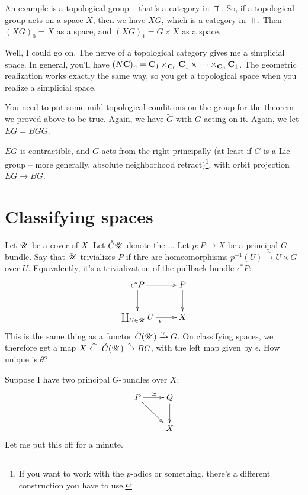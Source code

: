 An example is a topological group -- that's a category in $\Top$.
So, if a topological group acts on a space $X$, then we have $XG$, which is a category in $\Top$.
Then $(XG)_0 = X$ as a space, and $(XG)_1 = G\times X$ as a space.

Well, I could go on.
The nerve of a topological category gives me a simplicial space.
In general, you'll have $(N\mathbf C)_n = \mathbf C_1\times_{\mathbf C_0}\mathbf C_1\times\cdots\times_{\mathbf C_0}\mathbf C_1$.
The geometric realization works exactly the same way, so you get a topological space when you realize a simplicial space.

You need to put some mild topological conditions on the group for the theorem we proved above to be true.
Again, we have $\widetilde{G}$ with $G$ acting on it.
Again, we let $EG = B\widetilde{G}G$.
\begin{theorem}
    $EG$ is contractible, and $G$ acts from the right principally (at least if $G$ is a Lie group -- more generally, absolute neighborhood retract)\footnote{If you want to work with the $p$-adics or something, there's a different construction you have to use.}, with orbit projection $EG\to BG$.
\end{theorem}
\section{Classifying spaces}
Let $\mathscr U$ be a cover of $X$.
Let $\check{C}\mathscr U$ denote the ...
Let $p:P\to X$ be a principal $G$-bundle.
Say that $\mathscr U$ trivializes $P$ if thre are homeomorphisms $p^{-1}(U)\xrightarrow{\simeq} U\times G$ over $U$.
Equivalently, it's a trivialization of the pullback bundle $\epsilon^\ast P$:
\begin{equation*}
    \xymatrix{
	\epsilon^\ast P\ar[r]\ar[d] & P\ar[d]\\
	\coprod_{U\in\cU} U\ar[r]_{\epsilon} & X
    }
\end{equation*}
This is the same thing as a functor $\check{C}(\mathscr U)\xrightarrow{\gamma} G$.
On classifying spaces, we therefore get a map $X\xleftarrow{\simeq} \check{C}(\mathscr U)\xrightarrow{\gamma} BG$, with the left map given by $\epsilon$.
How unique is $\theta$?

Suppose I have two principal $G$-bundles over $X$:
\begin{equation*}
    \xymatrix{
	P\ar[r]^{\simeq} \ar[dr] & Q\ar[d]\\
	& X
    }
\end{equation*}
Let me put this off for a minute.

